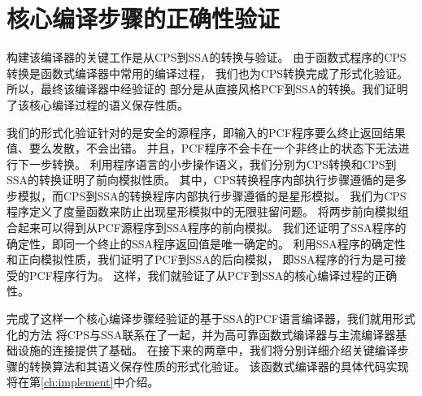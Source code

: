 \section{核心编译步骤的正确性验证}

构建该编译器的关键工作是从CPS到SSA的转换与验证。
由于函数式程序的CPS转换是函数式编译器中常用的编译过程，
我们也为CPS转换完成了形式化验证。所以，最终该编译器中经验证的
部分是从直接风格PCF到SSA的转换。我们证明了该核心编译过程的语义保存性质。

我们的形式化验证针对的是安全的源程序，即输入的PCF程序要么终止返回结果值、要么发散，不会出错。
并且，PCF程序不会卡在一个非终止的状态下无法进行下一步转换。
利用程序语言的小步操作语义，我们分别为CPS转换和CPS到SSA的转换证明了前向模拟性质。
其中，CPS转换程序内部执行步骤遵循的是多步模拟，而CPS到SSA的转换程序内部执行步骤遵循的是星形模拟。
我们为CPS程序定义了度量函数来防止出现星形模拟中的无限驻留问题。
将两步前向模拟组合起来可以得到从PCF源程序到SSA程序的前向模拟。
我们还证明了SSA程序的确定性，即同一个终止的SSA程序返回值是唯一确定的。
利用SSA程序的确定性和正向模拟性质，我们证明了PCF到SSA的后向模拟，
即SSA程序的行为是可接受的PCF程序行为。
这样，我们就验证了从PCF到SSA的核心编译过程的正确性。

完成了这样一个核心编译步骤经验证的基于SSA的PCF语言编译器，我们就用形式化的方法
将CPS与SSA联系在了一起，并为高可靠函数式编译器与主流编译器基础设施的连接提供了基础。
在接下来的两章中，我们将分别详细介绍关键编译步骤的转换算法和其语义保存性质的形式化验证。
该函数式编译器的具体代码实现将在第\ref{ch:implement}中介绍。